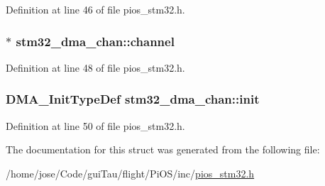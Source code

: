 Definition at line 46 of file pios\-\_\-stm32.\-h.

\hypertarget{structstm32__dma__chan_a83c74feec82b3ebc787cab90df6b2264}{
\subsubsection[{channel}]{$\ast$ stm32\-\_\-dma\-\_\-chan\-::channel}}\label{structstm32__dma__chan_a83c74feec82b3ebc787cab90df6b2264}


Definition at line 48 of file pios\-\_\-stm32.\-h.

\hypertarget{structstm32__dma__chan_a26b43c1f3ac4595c61a12d5bf54c39fb}{
\subsubsection[{init}]{\setlength{\rightskip}{0pt plus 5cm}D\-M\-A\-\_\-\-Init\-Type\-Def stm32\-\_\-dma\-\_\-chan\-::init}}\label{structstm32__dma__chan_a26b43c1f3ac4595c61a12d5bf54c39fb}


Definition at line 50 of file pios\-\_\-stm32.\-h.



The documentation for this struct was generated from the following file\-:\begin{DoxyCompactItemize}
\item 
/home/jose/\-Code/gui\-Tau/flight/\-Pi\-O\-S/inc/\hyperlink{pios__stm32_8h}{pios\-\_\-stm32.\-h}\end{DoxyCompactItemize}
